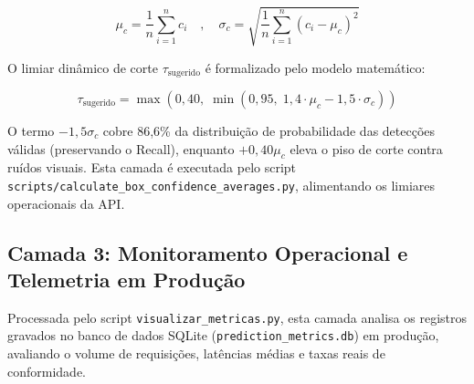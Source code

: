 \begin{equation}
    \mu_c = \frac{1}{n} \sum_{i=1}^{n} c_i \quad , \quad \sigma_c = \sqrt{\frac{1}{n} \sum_{i=1}^{n} (c_i - \mu_c)^2}
    \label{eq:media_desvio}
\end{equation}

O limiar dinâmico de corte $\tau_{\text{sugerido}}$ é formalizado pelo modelo matemático:

\begin{equation}
    \tau_{\text{sugerido}} = \max\left(0,40, \; \min\left(0,95, \; 1,4 \cdot \mu_c - 1,5 \cdot \sigma_c\right)\right)
    \label{eq:limiar_dinamico}
\end{equation}

O termo $-1,5\sigma_c$ cobre 86,6\% da distribuição de probabilidade das detecções válidas (preservando o Recall), enquanto $+0,40\mu_c$ eleva o piso de corte contra ruídos visuais. Esta camada é executada pelo script \texttt{scripts/calculate\_box\_confidence\_averages.py}, alimentando os limiares operacionais da API.

\subsection{Camada 3: Monitoramento Operacional e Telemetria em Produção}
Processada pelo script \texttt{visualizar\_metricas.py}, esta camada analisa os registros gravados no banco de dados SQLite (\texttt{prediction\_metrics.db}) em produção, avaliando o volume de requisições, latências médias e taxas reais de conformidade.
